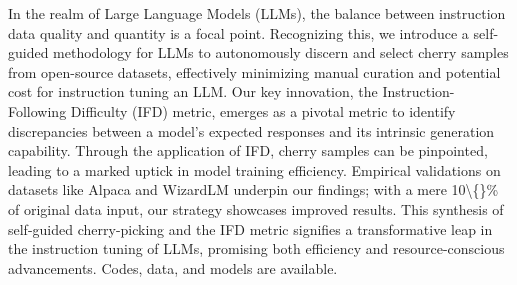 In the realm of Large Language Models (LLMs), the balance between instruction data quality and quantity is a focal point. Recognizing this, we introduce a self-guided methodology for LLMs to autonomously discern and select cherry samples from open-source datasets, effectively minimizing manual curation and potential cost for instruction tuning an LLM. Our key innovation, the Instruction-Following Difficulty (IFD) metric, emerges as a pivotal metric to identify discrepancies between a model's expected responses and its intrinsic generation capability. Through the application of IFD, cherry samples can be pinpointed, leading to a marked uptick in model training efficiency. Empirical validations on datasets like Alpaca and WizardLM underpin our findings; with a mere 10\textbackslash\{\}\% of original data input, our strategy showcases improved results. This synthesis of self-guided cherry-picking and the IFD metric signifies a transformative leap in the instruction tuning of LLMs, promising both efficiency and resource-conscious advancements. Codes, data, and models are available.